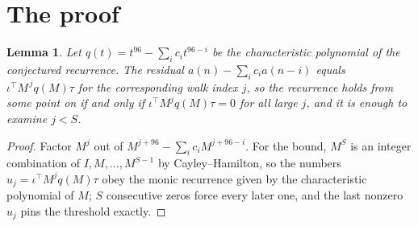 \documentclass[11pt,a4paper]{article}
\theoremstyle{plain}
\newtheorem{lemma}[theorem]{Lemma}
\theoremstyle{definition}
\begin{document}
\section{The proof}

\begin{lemma}\label{lem:crit}
Let $q(t)=t^{96}-\sum_i c_it^{96-i}$ be the characteristic polynomial of the
conjectured recurrence. The residual $a(n)-\sum_ic_ia(n-i)$ equals
$\iota^{\!\top}M^{\,j}q(M)\tau$ for the corresponding walk index $j$, so the recurrence
holds from some point on if and only if $\iota^{\!\top}M^{j}q(M)\tau=0$ for all large $j$,
and it is enough to examine $j<S$.
\end{lemma}

\begin{proof}
Factor $M^{j}$ out of $M^{j+96}-\sum_ic_iM^{j+96-i}$. For the bound, $M^{S}$
is an integer combination of $I,M,\dots,M^{S-1}$ by Cayley--Hamilton, so the numbers
$u_j=\iota^{\!\top}M^{j}q(M)\tau$ obey the monic recurrence given by the characteristic
polynomial of $M$; $S$ consecutive zeros force every later one, and the last nonzero $u_j$
pins the threshold exactly.
\end{proof}
\end{document}
